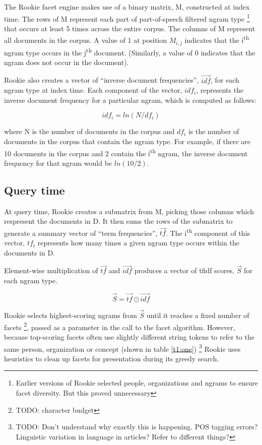 \documentclass{article}
\begin{document}
The Rookie facet engine makes use of a binary matrix, M, constructed at index time. The rows of M represent each part of part-of-speech filtered ngram type \footnote{Earlier versions of Rookie selected people, organizations and ngrams to ensure facet diversity. But this proved unnecessary} that occurs at least 5 times across the entire corpus. The columns of M represent all documents in the corpus. A value of 1 at position $M_{i,j}$ indicates that the i\textsuperscript{th} ngram type occurs in the j\textsuperscript{th} document. (Similarly, a value of 0 indicates that the ngram does not occur in the document).

Rookie also creates a vector of ``inverse document frequencies'', $\vec{idf}$, for each ngram type at index time. Each component of the vector, $idf_{i}$, represents the inverse document frequency for a particular ngram, which is computed as follows:

\begin{equation}
idf_{i} = ln(N/df_i)
\end{equation}

\noindent where N is the number of documents in the corpus and $df_{i}$ is the number of documents in the corpus that contain the ngram type. For example, if there are 10 documents in the corpus and 2 contain the i\textsuperscript{th} ngram, the inverse document frequency for that ngram would be $ln(10/2)$.

\subsection{Query time}

At query time, Rookie creates a submatrix from M, picking those columns which respresent the documents in D. It then sums the rows of the submatrix to generate a summary vector of ``term frequencies'', $\vec{tf}$. The i\textsuperscript{th} component of this vector, $tf_{i}$ represents how many times a given ngram type occurs within the documents in D. 

Element-wise multiplication of $\vec{tf}$ and $\vec{idf}$ produces a vector of tfidf scores, $\vec{S}$  for each ngram type.

\begin{equation}
\vec{S} = \vec{tf} \odot \vec{idf}
\end{equation}

Rookie selects highest-scoring ngrams from $\vec{S}$ until it reaches a fixed number of facets \footnote{TODO: character budget}, passed as a parameter in the call to the facet algorithm. However, because top-scoring facets often use slightly different string tokens to refer to the same person, organization or concept (shown in table \ref{t1:one}) \footnote{TODO: Don't understand why exactly this is happening. POS tagging errors? Linguistic variation in language in articles? Refer to different things?}
Rookie uses heuristics to clean up facets for presentation during its greedy search.
\end{document}
